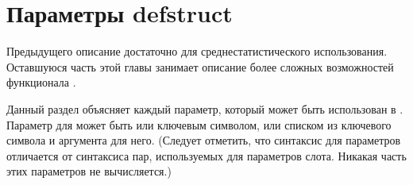 \section{Параметры defstruct}
\label{DEFSTRUCT-OPTIONS}
\label{Defstruct-Hairy-Stuff}

Предыдущего описание  достаточно для среднестатистического
использования. Оставшуюся часть этой главы занимает описание более сложных
возможностей функционала .

Данный раздел объясняет каждый параметр, который может быть
использован в . Параметр для  может быть
или ключевым символом, или списком из ключевого символа и аргумента
для него. (Следует отметить, что синтаксис для параметров
 отличается от синтаксиса пар, используемых для
параметров слота. Никакая часть этих параметров не вычисляется.)

